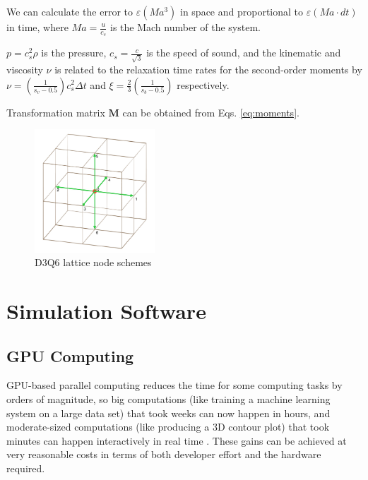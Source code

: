 We can calculate the error to $\varepsilon(Ma^3)$ in space and proportional to $\varepsilon (Ma \cdot dt)$ in time, where $Ma = \frac{u}{c_s}$ is the Mach number of the system.

$p = c_s^2 \rho$ is the pressure, $c_s = \frac{c}{\sqrt{3}}$ is the speed of sound, and the kinematic and viscosity $\nu$ is related to the relaxation time rates for the second-order moments by $\nu = \left(\frac{1}{s_v - 0.5}\right) c_s^2 \Delta t$ and $\xi = \frac{2}{3}\left(\frac{1}{s_b - 0.5}\right)$ respectively.

Transformation matrix $\bm{M}$ can be obtained from Eqs. \ref{eq:moments}.



\begin{figure}[!ht]
	\centering
	\includegraphics[width=0.4\textwidth]{figures/d3q6.jpg}
	\caption{D3Q6 lattice node schemes}
	\label{fig:d3q6-lattice}
\end{figure}

\section{Simulation Software}
\label{simulaiton-software}

\subsection{GPU Computing}
\label{gpu-computing}

GPU-based parallel computing reduces the time for some computing tasks by orders of magnitude, so big computations (like training a machine learning system on a large data set) that took weeks can now happen in hours, and moderate-sized computations (like producing a 3D contour plot) that took minutes can happen interactively in real time \cite{stortiCudaForEngineers2015}. These gains can be achieved at very reasonable costs in terms of both developer effort and the hardware required.

